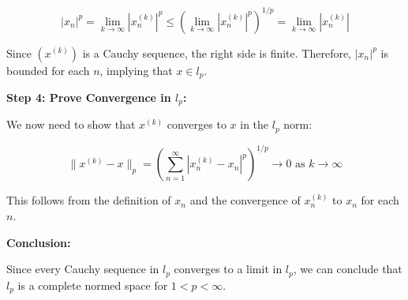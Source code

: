 \documentclass[12pt]{article}
\begin{document}
\[ |x_n|^p = \lim_{k \to \infty} |x_n^{(k)}|^p \leq \left( \lim_{k \to \infty} |x_n^{(k)}|^p \right)^{1/p} = \lim_{k \to \infty} |x_n^{(k)}| \]

Since \((x^{(k)})\) is a Cauchy sequence, the right side is finite. Therefore, \(|x_n|^p\) is bounded for each \(n\), implying that \(x \in l_p\).

\textbf{Step 4: Prove Convergence in \(l_p\):}

We now need to show that \(x^{(k)}\) converges to \(x\) in the \(l_p\) norm:

\[ \|x^{(k)} - x\|_p = \left( \sum_{n=1}^{\infty} |x_n^{(k)} - x_n|^p \right)^{1/p} \to 0 \text{ as } k \to \infty \]

This follows from the definition of \(x_n\) and the convergence of \(x_n^{(k)}\) to \(x_n\) for each \(n\).

\textbf{Conclusion:}

Since every Cauchy sequence in \(l_p\) converges to a limit in \(l_p\), we can conclude that \(l_p\) is a complete normed space for \(1 < p < \infty\).
\end{document}

